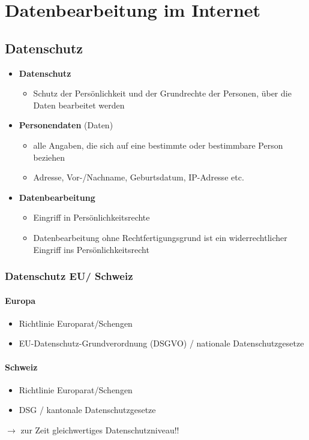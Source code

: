 \section{Datenbearbeitung im Internet}

\subsection{Datenschutz}
\begin{itemize}
    \item \textbf{Datenschutz}
    \begin{itemize}
        \item Schutz der Persönlichkeit und der Grundrechte der Personen, über die Daten bearbeitet werden
    \end{itemize}
    \item \textbf{Personendaten} (Daten)
    \begin{itemize}
        \item alle Angaben, die sich auf eine bestimmte oder bestimmbare Person beziehen
        \item Adresse, Vor-/Nachname, Geburtsdatum, IP-Adresse etc.
    \end{itemize}
    \item \textbf{Datenbearbeitung}
    \begin{itemize}
        \item Eingriff in Persönlichkeitsrechte
        \item Datenbearbeitung ohne Rechtfertigungsgrund ist ein widerrechtlicher Eingriff ins Persönlichkeitsrecht
    \end{itemize}
\end{itemize}

\subsubsection{Datenschutz EU/ Schweiz}
\begin{minipage}{0.5\linewidth}
    \paragraph{Europa}
    \begin{itemize}
        \item Richtlinie Europarat/Schengen
        \item EU-Datenschutz-Grundverordnung (DSGVO) / nationale Datenschutzgesetze
    \end{itemize}
\end{minipage}
\begin{minipage}{0.5\linewidth}
    \paragraph{Schweiz}
    \begin{itemize}
        \item Richtlinie Europarat/Schengen
        \item DSG / kantonale Datenschutzgesetze\\
    \end{itemize}
\end{minipage}
$\rightarrow$ zur Zeit gleichwertiges Datenschutzniveau!!

